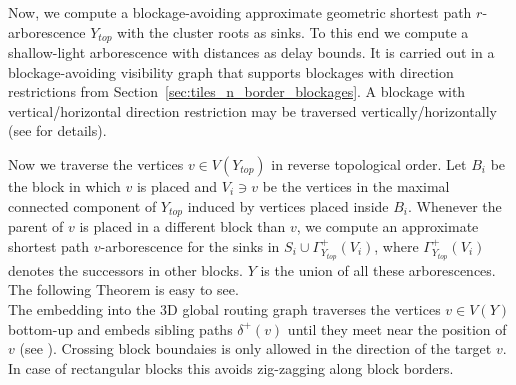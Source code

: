 \documentclass[a2paper]{bigsposter}
\begin{document}
\begin{blockrow}[3]
	
	Now, we compute a  blockage-avoiding approximate geometric shortest path $r$-arborescence $Y_{top}$ with the cluster roots as sinks.
	To this end we compute a shallow-light arborescence \cite{ShallowLight} with distances as delay bounds.
	It is carried out in a  blockage-avoiding visibility graph that supports blockages with direction restrictions from Section~\ref{sec:tiles_n_border_blockages}.
	A blockage with vertical/horizontal direction restriction may be traversed vertically/horizontally (see \cite{bihler-dissertation} for details).
	
	Now we traverse the vertices $v\in V(Y_{top})$ in reverse topological order.
	Let $B_i$ be the block in which $v$ is placed and $V_i\ni v$ be the vertices in the maximal connected component of $Y_{top}$ induced by vertices placed inside $B_i$.
	Whenever the parent of $v$ is placed in a different block than $v$, we compute an approximate shortest path $v$-arborescence for the  sinks in $S_i \cup \Gamma_{Y_{top}}^+(V_i)$,
	where $\Gamma_{Y_{top}}^+(V_i)$ denotes the successors in other blocks.
	$Y$ is the union of all these arborescences. The following Theorem is easy to see.\\
	
	The embedding into the 3D global routing graph traverses the vertices $v\in V(Y)$  bottom-up and embeds sibling paths $\delta^+(v)$
	until they meet near the position of $v$ (see \cite{BRGTiming2}).
	Crossing  block boundaies is only allowed in the direction of the target $v$.
	In case of rectangular blocks this avoids zig-zagging along block borders.\\
\end{blockrow}
\end{document}
